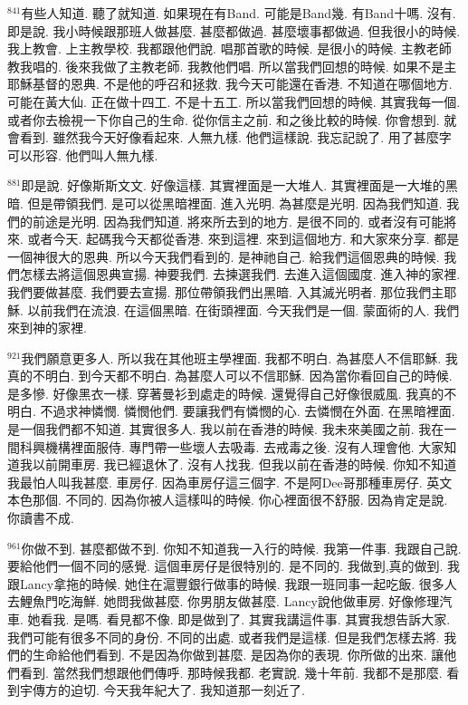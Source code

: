 \documentclass{book}
\begin{document}
$^{841}$有些人知道.
聽了就知道.
如果現在有Band.
可能是Band幾.
有Band十嗎.
沒有.
即是說.
我小時候跟那班人做甚麼.
甚麼都做過.
甚麼壞事都做過.
但我很小的時候.
我上教會.
上主教學校.
我都跟他們說.
唱那首歌的時候.
是很小的時候.
主教老師教我唱的.
後來我做了主教老師.
我教他們唱.
所以當我們回想的時候.
如果不是主耶穌基督的恩典.
不是他的呼召和拯救.
我今天可能還在香港.
不知道在哪個地方.
可能在黃大仙.
正在做十四工.
不是十五工.
所以當我們回想的時候.
其實我每一個.
或者你去檢視一下你自己的生命.
從你信主之前.
和之後比較的時候.
你會想到.
就會看到.
雖然我今天好像看起來.
人無九樣.
他們這樣說.
我忘記說了.
用了甚麼字可以形容.
他們叫人無九樣.

$^{881}$即是說.
好像斯斯文文.
好像這樣.
其實裡面是一大堆人.
其實裡面是一大堆的黑暗.
但是帶領我們.
是可以從黑暗裡面.
進入光明.
為甚麼是光明.
因為我們知道.
我們的前途是光明.
因為我們知道.
將來所去到的地方.
是很不同的.
或者沒有可能將來.
或者今天.
起碼我今天都從香港.
來到這裡.
來到這個地方.
和大家來分享.
都是一個神很大的恩典.
所以今天我們看到的.
是神祂自己.
給我們這個恩典的時候.
我們怎樣去將這個恩典宣揚.
神要我們.
去揀選我們.
去進入這個國度.
進入神的家裡.
我們要做甚麼.
我們要去宣揚.
那位帶領我們出黑暗.
入其滅光明者.
那位我們主耶穌.
以前我們在流浪.
在這個黑暗.
在街頭裡面.
今天我們是一個.
蒙面術的人.
我們來到神的家裡.

$^{921}$我們願意更多人.
所以我在其他班主學裡面.
我都不明白.
為甚麼人不信耶穌.
我真的不明白.
到今天都不明白.
為甚麼人可以不信耶穌.
因為當你看回自己的時候.
是多慘.
好像黑衣一樣.
穿著曼衫到處走的時候.
還覺得自己好像很威風.
我真的不明白.
不過求神憐憫.
憐憫他們.
要讓我們有憐憫的心.
去憐憫在外面.
在黑暗裡面.
是一個我們都不知道.
其實很多人.
我以前在香港的時候.
我未來美國之前.
我在一間科興機構裡面服侍.
專門帶一些壞人去吸毒.
去戒毒之後.
沒有人理會他.
大家知道我以前開車房.
我已經退休了.
沒有人找我.
但我以前在香港的時候.
你知不知道我最怕人叫我甚麼.
車房仔.
因為車房仔這三個字.
不是阿Dee哥那種車房仔.
英文本色那個.
不同的.
因為你被人這樣叫的時候.
你心裡面很不舒服.
因為肯定是說.
你讀書不成.

$^{961}$你做不到.
甚麼都做不到.
你知不知道我一入行的時候.
我第一件事.
我跟自己說.
要給他們一個不同的感覺.
這個車房仔是很特別的.
是不同的.
我做到,真的做到.
我跟Lancy拿拖的時候.
她住在滬豐銀行做事的時候.
我跟一班同事一起吃飯.
很多人去鯉魚門吃海鮮.
她問我做甚麼.
你男朋友做甚麼.
Lancy說他做車房.
好像修理汽車.
她看我.
是嗎.
看見都不像.
即是做到了.
其實我講這件事.
其實我想告訴大家.
我們可能有很多不同的身份.
不同的出處.
或者我們是這樣.
但是我們怎樣去將.
我們的生命給他們看到.
不是因為你做到甚麼.
是因為你的表現.
你所做的出來.
讓他們看到.
當然我們想跟他們傳呼.
那時候我都.
老實說.
幾十年前.
我都不是那麼.
看到宇傳方的迫切.
今天我年紀大了.
我知道那一刻近了.
\end{document}
